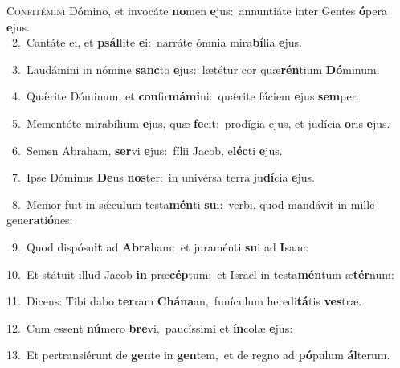 \lettrine{\initial\textcolor{\initialcolor}{C}}{onfitémini} Dómino, et invocáte \textbf{no}\-men \textbf{e}\-jus:~\star annuntiáte inter Gentes \textbf{ó}\-pera \textbf{e}\-jus.\\
{\numbfont\textcolor{\numbcolor}{~2.}}~Cantáte ei, et \textbf{psál}\-lite \textbf{e}\-i:~\star narráte ómnia mira\-\textbf{bí}\-lia \textbf{e}\-jus.\par
{\numbfont\textcolor{\numbcolor}{~3.}}~Laudámini in nómine \textbf{sanc}\-to \textbf{e}\-jus:~\star lætétur cor quæ\-\textbf{rén}\-tium \textbf{Dó}\-minum.\par
{\numbfont\textcolor{\numbcolor}{~4.}}~Quǽrite Dóminum, et \textbf{con}\-fir\-\textbf{má}\-\textbf{mi}ni:~\star quǽrite fáciem \textbf{e}\-jus \textbf{sem}\-per.\par
{\numbfont\textcolor{\numbcolor}{~5.}}~Mementóte mirabílium \textbf{e}\-jus, quæ \textbf{fe}\-cit:~\star prodígia ejus, et judícia \textbf{o}\-ris \textbf{e}\-jus.\par
{\numbfont\textcolor{\numbcolor}{~6.}}~Semen Abraham, \textbf{ser}\-vi \textbf{e}\-jus:~\star fílii Jacob, e\-\textbf{léc}\-ti \textbf{e}\-jus.\par
{\numbfont\textcolor{\numbcolor}{~7.}}~Ipse Dóminus \textbf{De}\-us \textbf{nos}\-ter:~\star in univérsa terra ju\-\textbf{dí}\-cia \textbf{e}\-jus.\par
{\numbfont\textcolor{\numbcolor}{~8.}}~Memor fuit in sǽculum testa\-\textbf{mén}\-ti \textbf{su}\-i:~\star verbi, quod mandávit in mille gene\-\textbf{ra}\-ti\-\textbf{ó}\-nes:\par
{\numbfont\textcolor{\numbcolor}{~9.}}~Quod dispósu\textbf{it} ad \textbf{A}\-\textbf{bra}ham:~\star et juraménti \textbf{su}\-i ad \textbf{I}\-saac:\par
{\numbfont\textcolor{\numbcolor}{10.}}~Et státuit illud Jacob \textbf{in} præ\-\textbf{cép}\-tum:~\star et Israël in testa\-\textbf{mén}\-tum æ\-\textbf{tér}\-num:\par
{\numbfont\textcolor{\numbcolor}{11.}}~Dicens: Tibi dabo \textbf{ter}\-ram \textbf{Chá}\-\textbf{na}an,~\star funículum heredi\-\textbf{tá}\-tis \textbf{ves}\-træ.\par
{\numbfont\textcolor{\numbcolor}{12.}}~Cum essent \textbf{nú}\-mero \textbf{bre}\-vi,~\star paucíssimi et \textbf{ín}\-colæ \textbf{e}\-jus:\par
{\numbfont\textcolor{\numbcolor}{13.}}~Et pertransiérunt de \textbf{gen}\-te in \textbf{gen}\-tem,~\star et de regno ad \textbf{pó}\-pulum \textbf{ál}\-terum.\par
